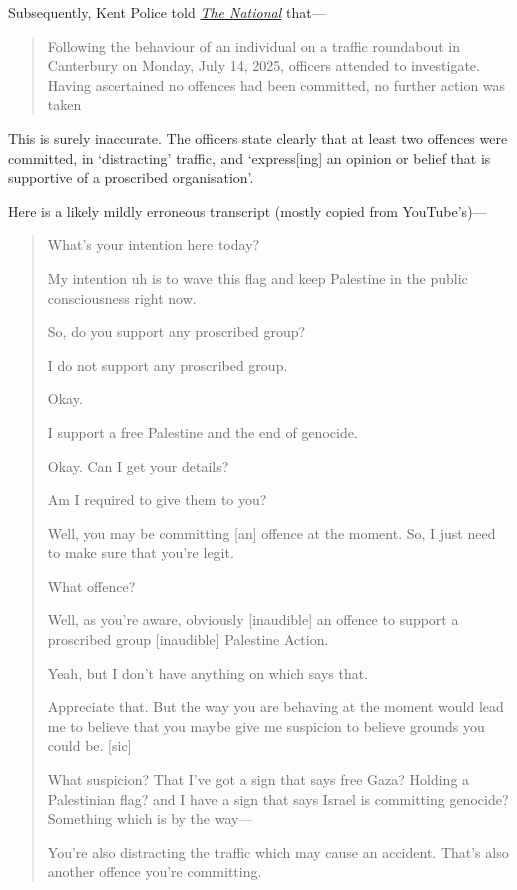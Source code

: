 Subsequently, Kent Police told \href{https://www.thenational.scot/news/25321245.disturbed-mp-hits-armed-police-threaten-gaza-protester/}{\emph{The National}} that---
\begin{quote}
    Following the behaviour of an individual on a traffic roundabout in Canterbury on Monday, July 14, 2025, officers attended to investigate. Having ascertained no offences had been committed, no further action was taken
\end{quote}

This is surely inaccurate. The officers state clearly that at least two offences were committed, in ‘distracting’ traffic, and ‘express[ing] an opinion or belief that is supportive of a proscribed organisation’.

Here is a likely mildly erroneous transcript (mostly copied from YouTube’s)—
\begin{quote}
    What's your intention here today?
    
    My intention uh is to wave this flag and keep Palestine in the public consciousness right now.
    
    So, do you support any proscribed group?
    
    I do not support any proscribed group.
    
    Okay.
    
    I support a free Palestine and the end of genocide.
    
    Okay. Can I get your details?
    
    Am I required to give them to you?
    
    Well, you may be committing [an] offence at the moment. So, I just need to make sure that you're legit.
    
    What offence?
    
    Well, as you're aware, obviously [inaudible] an offence to support a proscribed group [inaudible] Palestine Action.
    
    Yeah, but I don't have anything on which says that.
    
    Appreciate that. But the way you are behaving at the moment would lead me to believe that you maybe give me suspicion to believe grounds you could be. [sic]
    
    What suspicion? That I've got a sign that says free Gaza? Holding a Palestinian flag? and I have a sign that says Israel is committing genocide? Something which is by the way—
    
    You’re also distracting the traffic which may cause an accident. That's also another offence you're committing.
    

\end{quote}
